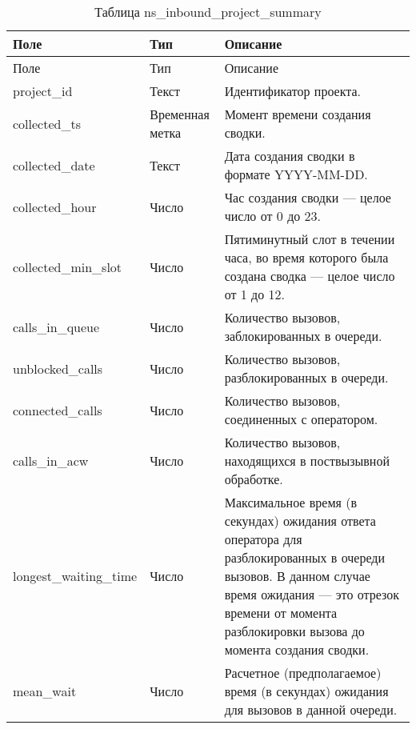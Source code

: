 \begin{small}
    \begin{longtable}{|p{}|p{}|p{}|}
        \caption{Таблица ns\_inbound\_project\_summary}
        \label{tab:db:ns-inbound-project-summary}
        \\ \hline
        Поле & Тип & Описание \\
        \hline \endfirsthead
        \hline
        Поле & Тип & Описание \\
        \hline
        \endhead
        \hline \endlastfoot
        project\_id &
        Текст &
        Идентификатор проекта. \\
 \hline
        collected\_ts &
        Временная метка &
        Момент времени создания сводки. \\
 \hline
        collected\_date &
        Текст &
        Дата создания сводки в формате YYYY-MM-DD. \\
 \hline
        collected\_hour &
        Число &
        Час создания сводки — целое число от 0 до 23. \\
 \hline
        collected\_min\_slot &
        Число &
        Пятиминутный слот в течении часа, во время которого была создана сводка — целое число от 1 до 12. \\
 \hline
        calls\_in\_queue &
        Число &
        Количество вызовов, заблокированных в очереди. \\
 \hline
        unblocked\_calls &
        Число &
        Количество вызовов, разблокированных в очереди. \\
 \hline
        connected\_calls &
        Число &
        Количество вызовов, соединенных с оператором. \\
 \hline
        calls\_in\_acw &
        Число &
        Количество вызовов, находящихся в поствызывной обработке. \\
 \hline
        longest\_waiting\_time &
        Число &
        Максимальное время (в секундах) ожидания ответа оператора для разблокированных в очереди вызовов.
        В данном случае время ожидания — это отрезок времени от момента разблокировки вызова до момента создания сводки.\\
 \hline
        mean\_wait &
        Число &
        Расчетное (предполагаемое) время (в секундах) ожидания для вызовов в данной очереди.\\
    \end{longtable}
\end{small}

